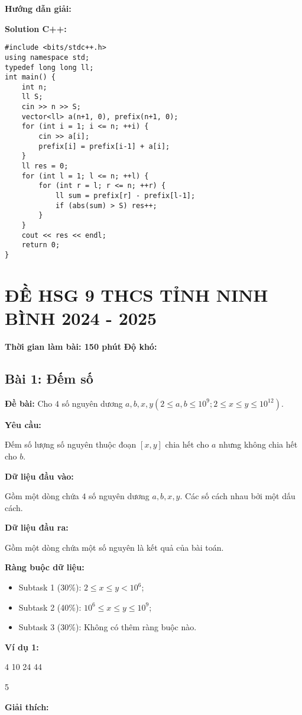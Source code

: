 \documentclass[12pt]{scrartcl}  %
\begin{document}
\textbf{Hướng dẫn giải:}

\textbf{Solution C++:}
\begin{lstlisting}
#include <bits/stdc++.h>
using namespace std;
typedef long long ll;
int main() {
    int n;
    ll S;
    cin >> n >> S;
    vector<ll> a(n+1, 0), prefix(n+1, 0);
    for (int i = 1; i <= n; ++i) {
        cin >> a[i];
        prefix[i] = prefix[i-1] + a[i];
    }
    ll res = 0;
    for (int l = 1; l <= n; ++l) {
        for (int r = l; r <= n; ++r) {
            ll sum = prefix[r] - prefix[l-1];
            if (abs(sum) > S) res++;
        }
    }
    cout << res << endl;
    return 0;
}
\end{lstlisting}

\section{ĐỀ HSG 9 THCS TỈNH NINH BÌNH 2024 - 2025}
\textbf{Thời gian làm bài: 150 phút} 
\textbf{Độ khó: }

\subsection{Bài 1: Đếm số}
\textbf{Đề bài:}
Cho $4$ số nguyên dương $a, b, x, y (2 \leq a, b \leq 10^9; 2 \leq x \leq y \leq 10^{12})$.

\textbf{Yêu cầu:}

Đếm số lượng số nguyên thuộc đoạn $\left[ x, y \right]$ chia hết cho $a$ nhưng không chia hết cho $b$. 

\textbf{Dữ liệu đầu vào:}

Gồm một dòng chứa $4$ số nguyên dương $a, b, x, y$. Các số cách nhau bởi một dấu cách.

\textbf{Dữ liệu đầu ra:}

Gồm một dòng chứa một số nguyên là kết quả của bài toán.

\textbf{Ràng buộc dữ liệu:}
\begin{itemize}
    \item Subtask 1 (30\%): $2 \leq x \leq y < 10^6$;
    \item Subtask 2 (40\%): $10^6 \leq x \leq y \leq 10^{9}$;
    \item Subtask 3 (30\%): Không có thêm ràng buộc nào.
\end{itemize}

\textbf{Ví dụ 1:}
\begin{tcolorbox}[colback=gray!5!white, colframe=blue!50!black, title=Input]
4 10 24 44
\end{tcolorbox}
\begin{tcolorbox}[colback=gray!5!white, colframe=green!50!black, title=Output]
5
\end{tcolorbox}
\textbf{Giải thích:}
\end{document}
